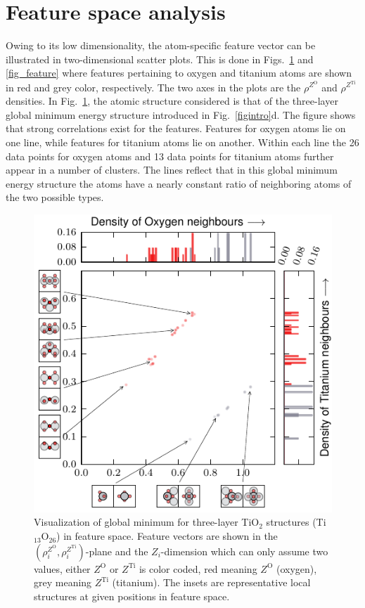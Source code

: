\documentclass[aip,amsmath,amssymb,reprint]{revtex4-1}
\begin{document}
\section{Feature space analysis}

Owing to its low dimensionality, the atom-specific feature vector can
be illustrated in two-dimensional scatter plots. This is done in
Figs.\  \ref{fig_global} and \ref{fig_feature} where features
pertaining to oxygen and titanium atoms are shown in red and grey
color, respectively.  The two axes in the plots are the
$\rho^{Z^\mathrm{O}}$ and $\rho^{Z^\mathrm{Ti}}$ densities.  In
Fig.\  \ref{fig_global}, the atomic structure considered is that of the
three-layer global minimum energy structure introduced in
Fig.\  \ref{figintro}d. The figure shows that strong correlations exist
for the features. Features for oxygen atoms lie on one line, while
features for titanium atoms lie on another. Within each line the 26
data points for oxygen atoms and 13 data points for titanium atoms
further appear in a number of clusters. The lines reflect that in this
global minimum energy structure the atoms have a nearly constant
ratio of neighboring atoms of the two possible types.

\begin{figure}[tb]
    \centering
    \includegraphics[width=1.0\columnwidth]{fig2-gm_scatterplot.pdf}
    \caption{Visualization of global minimum for three-layer TiO$_2$
      structures (Ti$_{13}$O$_{26}$) in feature space. Feature vectors
      are shown in the
      $\left(\rho_i^{Z^\mathrm{O}},\rho_i^{Z^\mathrm{Ti}}\right)$-plane
        and the $Z_i$-dimension which can only assume two values,
        either $Z^\mathrm{O}$ or $Z^\mathrm{Ti}$ is color coded, red meaning $Z^\mathrm{O}$ (oxygen),
        grey meaning $Z^\mathrm{Ti}$ (titanium). The insets are representative
      local structures at given positions in feature space.}
    \label{fig_global}
\end{figure}
\end{document}
